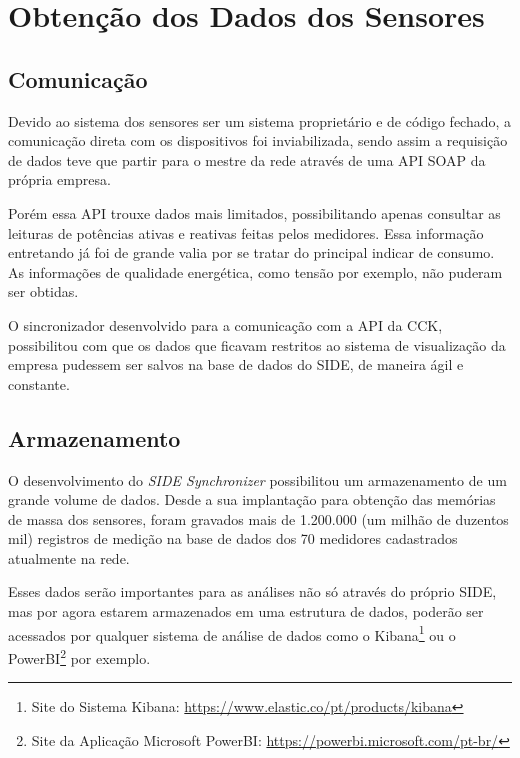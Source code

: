\chapter{Obtenção dos Dados dos Sensores}
\label{c:obtencao_dos_dados_dos_sensores}

\section{Comunicação}

Devido ao sistema dos sensores ser um sistema proprietário e de código fechado, a comunicação direta com os dispositivos foi inviabilizada, sendo assim a requisição de dados teve que partir para o mestre da rede através de uma API SOAP da própria empresa.

Porém essa API trouxe dados mais limitados, possibilitando apenas consultar as leituras de potências ativas e reativas feitas pelos medidores. Essa informação entretando já foi de grande valia por se tratar do principal indicar de consumo. As informações de qualidade energética, como tensão por exemplo, não puderam ser obtidas.

O sincronizador desenvolvido para a comunicação com a API da CCK, possibilitou com que os dados que ficavam restritos ao sistema de visualização da empresa pudessem ser salvos na base de dados do SIDE, de maneira ágil e constante.

\section{Armazenamento}

O desenvolvimento do \textit{SIDE Synchronizer} possibilitou um armazenamento de um grande volume de dados. Desde a sua implantação para obtenção das memórias de massa dos sensores, foram gravados mais de 1.200.000 (um milhão de duzentos mil) registros de medição na base de dados dos 70 medidores cadastrados atualmente na rede. 

Esses dados serão importantes para as análises não só através do próprio SIDE, mas por agora estarem armazenados em uma estrutura de dados, poderão ser acessados por qualquer sistema de análise de dados como o Kibana\footnote{Site do Sistema Kibana: \url{https://www.elastic.co/pt/products/kibana}} ou o PowerBI\footnote{Site da Aplicação Microsoft PowerBI: \url{https://powerbi.microsoft.com/pt-br/}} por exemplo.

